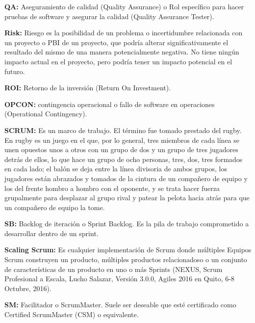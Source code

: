 \begin{description}
  \item {\textbf{QA:} Aseguramiento de calidad (Quality Assurance) o Rol específico para hacer pruebas de software y asegurar la calidad (Quality Assurance Tester).}
  
  \item {\textbf{Risk:} Riesgo es la posibilidad de un problema o incertidumbre relacionada con un proyecto o PBI de un proyecto, que podría alterar significativamente el resultado del mismo de una manera potencialmente negativa. No tiene ningún impacto actual en el proyecto, pero podría tener un impacto potencial en el futuro.}
  
  \item {\textbf{ROI:} Retorno de la inversión (Return On Investment).}

  \item {\textbf{OPCON:} contingencia operacional o fallo de software en operaciones (Operational Contingency).}

  \item {\textbf{SCRUM:} Es un marco de trabajo. El término fue tomado prestado del rugby. En rugby es un juego en el que, por lo general, tres miembros de cada línea se unen opuestos unos a otros con un grupo de dos y un grupo de tres jugadores detrás de ellos, lo que hace un grupo de ocho personas, tres, dos, tres formados en cada lado; el balón se deja entre la línea divisoria de ambos grupos, los jugadores están abrazados y tomados de la cintura de un compañero de equipo y los del frente hombro a hombro con el oponente, y se trata hacer fuerza grupalmente para desplazar al grupo rival y patear la pelota hacia atrás para que un compañero de equipo la tome.}
  
  \item {\textbf{SB:} Backlog de iteración o Sprint Backlog. Es la pila de trabajo comprometido a desarrollar dentro de un sprint.}
  
  \item {\textbf{Scaling Scrum:} Es cualquier implementación de Scrum donde múltiples Equipos Scrum construyen un producto, múltiples productos relacionadoso o un conjunto de características de un producto en uno o más Sprints (NEXUS, Scrum Profesional a Escala, Lucho Salazar, Versión 3.0.0,  Agiles 2016 en Quito, 6-8 Octubre, 2016).}
  
  \item {\textbf{SM:} Facilitador o ScrumMaster. Suele ser deseable que esté certificado como Certified ScrumMaster (CSM) o equivalente. }


\end{description}
